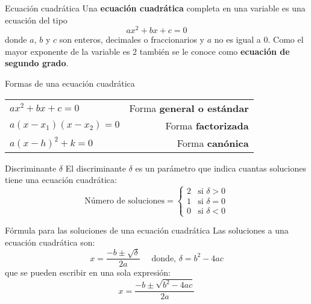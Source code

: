 \begin{infocard}{Ecuación cuadrática}
    Una \textbf{ecuación cuadrática} completa en una variable es una ecuación del tipo
    \begin{equation}
        ax^2 + bx + c = 0
    \end{equation}
    donde $a$, $b$ y $c$ son enteros, decimales o fraccionarios y $a$ no es igual a 0. Como el
    mayor exponente de la variable es 2 también se
    le conoce como \textbf{ecuación de segundo grado}.
\end{infocard}


\begin{infocard}{Formas de una ecuación cuadrática}
    \begin{tabular}{lr}
        $ ax^2+bx+c = 0$    & Forma \textbf{general o estándar} \\
        $a(x-x_1)(x-x_2)=0$ & Forma \textbf{factorizada}        \\
        $a(x-h)^2+k=0$      & Forma \textbf{canónica}
    \end{tabular}
\end{infocard}

\begin{infocard}{Discriminante $\delta$}
    El discriminante $\delta$ es un parámetro que indica cuantas soluciones tiene una ecuación cuadrática:
    \[\text{Número de soluciones}=
        \begin{cases}
            2 & \text{si } \delta > 0 \\
            1 & \text{si } \delta = 0 \\
            0 & \text{si } \delta < 0
        \end{cases}
    \]
\end{infocard}

\begin{infocard}{Fórmula para las soluciones de una ecuación cuadrática}
    Las soluciones a una ecuación cuadrática son:
    \[
        x = \frac{-b\pm \sqrt{\delta}}{2a} \quad \text{ donde, }\delta=b^2-4ac
    \]
    que se pueden escribir en una sola expresión:
    \[x= \dfrac{-b\pm\sqrt{b^2-4ac}}{2a}\]
\end{infocard}
